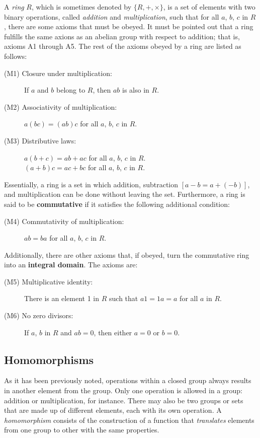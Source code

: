 A \emph{ring} $R$, which is sometimes denoted by $\{R, +, \times \}$, is a set of elements with two binary operations, called \textit{addition} and \textit{multiplication}, such that for all $a$, $b$, $c$ in $R$, there are some axioms that must be obeyed. It must be pointed out that a ring fulfills the same axions as an abelian group with respect to addition; that is, axioms A1 through A5. The rest of the axioms obeyed by a ring are listed as follows:
\begin{description}
\item[(M1) Closure under multiplication:] If $a$ and $b$ belong to $R$, then $ab$ is also in $R$.
\item[(M2) Associativity of multiplication:] $a(bc) = (ab)c$ for all $a$, $b$, $c$ in $R$.
\item[(M3) Distributive laws:] $a(b+c) = ab+ ac$ for all $a$, $b$, $c$ in $R$. \\ $(a+b)c = ac + bc$ for all $a$, $b$, $c$ in $R$.
\end{description}

Essentially, a ring is a set in which addition, subtraction $[a-b = a + (-b)]$, and multiplication can be done without leaving the set. Furthermore, a ring is said to be \textbf{commutative} if it satisfies the following additional condition:
\begin{description}
\item[(M4) Commutativity of multiplication:] $ab = ba$ for all $a$, $b$, $c$ in $R$.
\end{description}

Additionally, there are other axioms that, if obeyed, turn the commutative ring into an \textbf{integral domain}. The axioms are:  

\begin{description}
\item[(M5) Multiplicative identity:] There is an element 1 in $R$ such that $a1 = 1a = a$ for all $a$ in $R$.
\item[(M6) No zero divisors:] If $a$, $b$ in $R$ and $ab=0$, then either $a=0$ or $b=0$.
\end{description}

\subsection{Homomorphisms}

As it has been previously noted, operations within a closed group always results in another element from the group. Only one operation is allowed in a group: addition or multiplication, for instance. There may also be two groups or sets that are made up of different elements, each with its own operation. A \emph{homomorphism} consists of the construction of a function that \emph{translates} elements from one group to other with the same properties.

